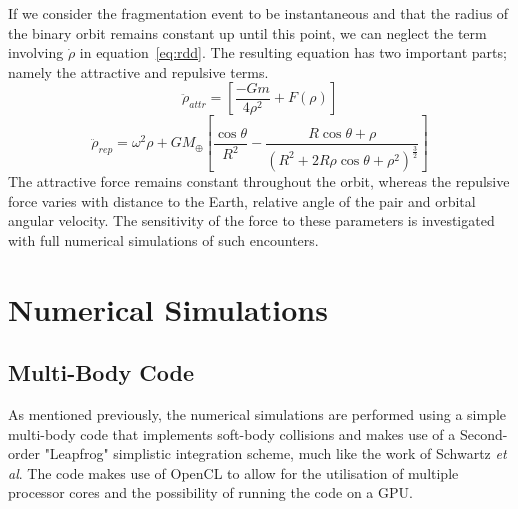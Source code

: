 \documentclass[letterpaper, preprint, paper,11pt]{AAS}	%
\begin{document}
If we consider the fragmentation event to be instantaneous and that the radius of the binary orbit remains constant up until this point, we can neglect the term involving $\dot{\rho}$ in equation~\ref{eq:rdd}. The resulting equation has two important parts; namely the attractive and repulsive terms.
\begin{equation} \label{eq:attr}
\ddot{\rho}_{attr} = \left[\frac{-Gm}{4\rho^{2}}+F(\rho)\right]
\end{equation}
\begin{equation} \label{eq:rep}
\ddot{\rho}_{rep} = \omega^{2}\rho+{GM_\oplus}\left[\frac{\cos\theta}{R^{2}}-\frac{R\cos\theta+\rho}{(R^{2}+2R\rho\cos\theta+\rho^{2})^\frac{3}{2}}\right]
\end{equation}
The attractive force remains constant throughout the orbit, whereas the repulsive force varies with distance to the Earth, relative angle of the pair and orbital angular velocity. The sensitivity of the force to these parameters is investigated with full numerical simulations of such encounters. 


\section{Numerical Simulations}
\subsection{Multi-Body Code}
As mentioned previously, the numerical simulations are performed using a simple multi-body code that implements soft-body collisions and makes use of a Second-order "Leapfrog" simplistic integration scheme, much like the work of Schwartz \textit{et al}\cite{soft}. The code makes use of OpenCL to allow for the utilisation of multiple processor cores and the possibility of running the code on a GPU. 
\end{document}
